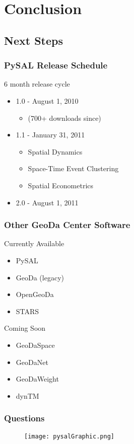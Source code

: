 \section{Conclusion} 

\subsection{Next Steps} 

\begin{frame}
	\frametitle{PySAL Release Schedule}
	\begin{block}{6 month release cycle}
 \begin{itemize}
 \item 1.0 - August 1, 2010
        \begin{itemize}
	  \item (700+ downloads since)
	\end{itemize}
 \item 1.1 - January 31, 2011
        \begin{itemize}
	  \item Spatial Dynamics
	  \item Space-Time Event Clustering
	  \item \alert{Spatial Econometrics}
	\end{itemize}
\item 2.0 - August 1, 2011
 \end{itemize}
 \end{block}
 \end{frame} 

\begin{frame}
	\frametitle{Other GeoDa Center Software}
 
\begin{block}{Currently Available}
 \begin{itemize}
 \item PySAL
 \item GeoDa (legacy)
 \item OpenGeoDa
 \item STARS
 \end{itemize}
 \end{block} 
\begin{block}{Coming Soon}
 \begin{itemize}
 \item GeoDaSpace
 \item GeoDaNet
 \item GeoDaWeight
 \item dynTM
 \end{itemize}
 \end{block} \end{frame} 

\begin{frame}
	\frametitle{Questions}
  \begin{center}
 \begin{figure}[htbp]
 \texttt{[image: pysalGraphic.png]}
 \end{figure}
  {}\\
  {}
 \end{center}
 \end{frame} 



